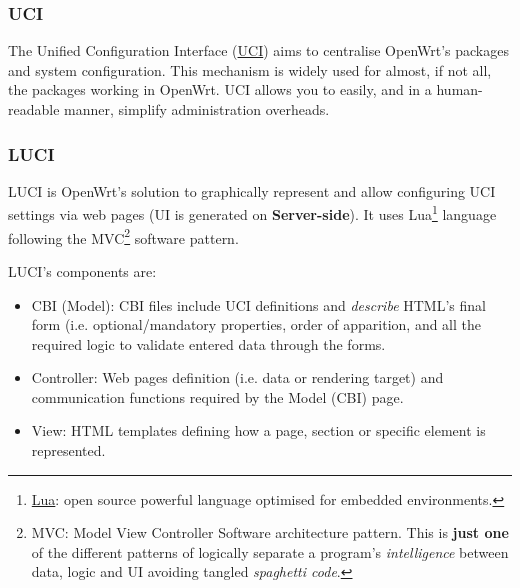 \subsubsection{UCI}
The Unified Configuration Interface (\href{https://wiki.openwrt.org/doc/uci}{UCI}) aims to centralise OpenWrt's packages and system configuration. This mechanism is widely used for almost, if not all, the packages working in OpenWrt. UCI allows you to easily, and in a human-readable manner, simplify administration overheads.

\subsubsection{LUCI}
LUCI is OpenWrt's solution to graphically represent and allow configuring UCI settings via web pages (UI is generated on \textbf{Server-side}). It uses Lua\footnote{\href{https://www.lua.org/manual/5.1/}{Lua}: open source powerful language optimised for embedded environments.} language following the MVC\footnote{MVC: Model View Controller Software architecture pattern. This is \textbf{just one} of the different patterns of logically separate a program's \textit{intelligence} between data, logic and UI avoiding tangled \textit{spaghetti code}.} software pattern.

LUCI's components are:
\begin{itemize}
    \item CBI (Model): CBI files include UCI definitions and \textit{describe} HTML's final form (i.e. optional/mandatory properties, order of apparition, and all the required logic to validate entered data through the forms.
    \item Controller: Web pages definition (i.e. data or rendering target) and communication functions required by the Model (CBI) page.
    \item View: HTML templates defining how a page, section or specific element is represented.
\end{itemize}

